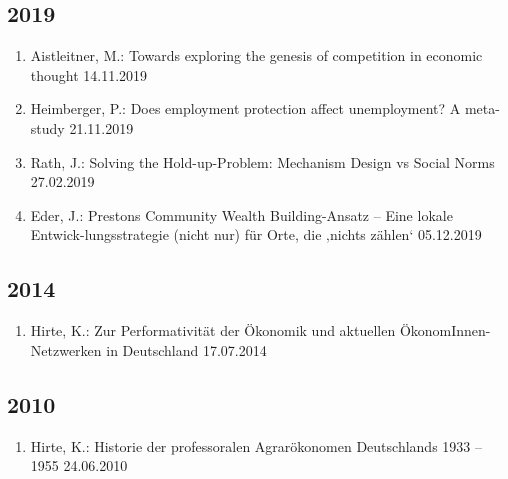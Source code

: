 \subsection*{2019}
\begin{enumerate}
	\item Aistleitner, M.: Towards exploring the genesis of competition in economic thought 14.11.2019
	\item Heimberger, P.: Does employment protection affect unemployment? A meta-study 21.11.2019
	\item Rath, J.: Solving the Hold-up-Problem: Mechanism Design vs Social Norms 27.02.2019
	\item Eder, J.: Prestons Community Wealth Building-Ansatz – Eine lokale Entwick-lungsstrategie (nicht nur) für Orte, die ‚nichts zählen‘ 05.12.2019
\end{enumerate}
\subsection*{2014}
\begin{enumerate}
	\item Hirte, K.: Zur Performativität der Ökonomik und aktuellen ÖkonomInnen-Netzwerken in Deutschland 17.07.2014
\end{enumerate}
\subsection*{2010}
\begin{enumerate}
	\item Hirte, K.: Historie der professoralen Agrarökonomen Deutschlands 1933 – 1955 24.06.2010
\end{enumerate}
